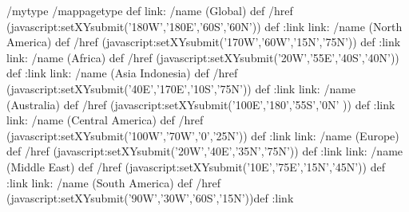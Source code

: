 \begin{ingrid}
/mytype /mappagetype def
link:
/name (Global) def
/href (javascript:setXYsubmit('180W','180E','60S','60N')) def
:link
link:
/name (North America) def
/href (javascript:setXYsubmit('170W','60W','15N','75N')) def
:link
link:
/name (Africa) def
/href (javascript:setXYsubmit('20W','55E','40S','40N')) def
:link
link:
/name (Asia Indonesia) def
/href (javascript:setXYsubmit('40E','170E','10S','75N')) def
:link
link:
/name (Australia) def
/href (javascript:setXYsubmit('100E','180','55S','0N' )) def
:link
link:
/name (Central America) def
/href (javascript:setXYsubmit('100W','70W','0','25N')) def
:link
link:
/name (Europe) def
/href (javascript:setXYsubmit('20W','40E','35N','75N')) def
:link
link:
/name (Middle East) def
/href (javascript:setXYsubmit('10E','75E','15N','45N')) def
:link
link:
/name (South America) def
/href (javascript:setXYsubmit('90W','30W','60S','15N'))def
:link
\end{ingrid}
